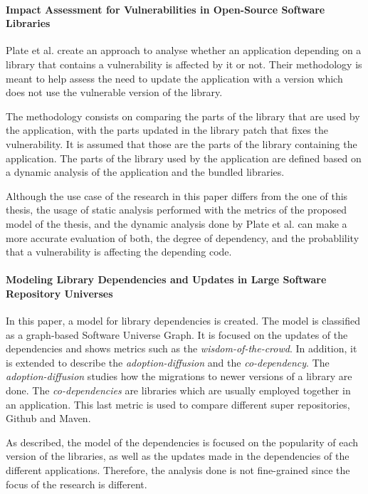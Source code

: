 \paragraph{Impact Assessment for Vulnerabilities in Open-Source Software Libraries \cite{plate2015impact}}
Plate et al. create an approach to analyse whether an application depending on a library that contains a vulnerability is affected by it or not. Their methodology is meant to help assess the need to update the application with a version which does not use the vulnerable version of the library.

The methodology consists on comparing the parts of the library that are used by the application, with the parts updated in the library patch that fixes the vulnerability. It is assumed that those are the parts of the library containing the application. The parts of the library used by the application are defined based on a dynamic analysis of the application and the bundled libraries.

Although the use case of the research in this paper differs from the one of this thesis, the usage of static analysis performed with the metrics of the proposed model of the thesis, and the dynamic analysis done by Plate et al. can make a more accurate evaluation of both, the degree of dependency, and the probablility that a vulnerability is affecting the depending code.

\paragraph{Modeling Library Dependencies and Updates in Large Software Repository Universes \cite{Kula2017}}
In this paper, a model for library dependencies is created. The model is classified as a graph-based Software Universe Graph. It is focused on the updates of the dependencies and shows metrics such as the \textit{wisdom-of-the-crowd}. In addition, it is extended to describe the \textit{adoption-diffusion} and the \textit{co-dependency}. The \textit{adoption-diffusion} studies how the migrations to newer versions of a library are done. The \textit{co-dependencies} are libraries which are usually employed together in an application. This last metric is used to compare different super repositories, Github and Maven.

As described, the model of the dependencies is focused on the popularity of each version of the libraries, as well as the updates made in the dependencies of the different applications. Therefore, the analysis done is not fine-grained since the focus of the research is different.

